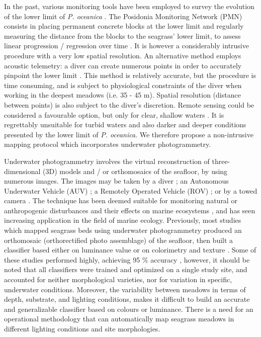 In the past, various monitoring tools have been employed to survey the evolution of the lower limit of \textit{P. oceanica} \citep{noel_cahier_2012}. The Posidonia Monitoring Network (PMN) consists in placing permanent concrete blocks at the lower limit and regularly measuring the distance from the blocks to the seagrass’ lower limit, to assess linear progression / regression over time \citep{boudouresque_monitoring_2007, pergent_protocole_2007}. It is however a considerably intrusive procedure with a very low spatial resolution. An alternative method employs acoustic telemetry: a diver can create numerous points in order to accurately pinpoint the lower limit \citep{descamp_underwater_2005, descamp_fast_2011}. This method is relatively accurate, but the procedure is time consuming, and is subject to physiological constraints of the diver when working in the deepest meadows (i.e. 35 - 45 m). Spatial resolution (distance between points) is also subject to the diver’s discretion. Remote sensing could be considered a favourable option, but only for clear, shallow waters \citep{koedsin_integrated_2016, pu_mapping_2017, topouzelis_seagrass_2018, traganos_mapping_2018}. It is regrettably unsuitable for turbid waters and also darker and deeper conditions presented by the lower limit of \textit{P. oceanica}. We therefore propose a non-intrusive mapping protocol which incorporates underwater photogrammetry.

Underwater photogrammetry involves the virtual reconstruction of three-dimensional (3D) models and / or orthomosaics of the seafloor, by using numerous images. The images may be taken by a diver \citep{mizuno_simple_2017}; an Autonomous Underwater Vehicle (AUV) \citep{bryson_automated_2013, bonin-font_towards_2016}; a Remotely Operated Vehicle (ROV) \citep{drap_rov_2015}; or by a towed camera \citep{rende_advances_2015}. The technique has been deemed suitable for monitoring natural or anthropogenic disturbances and their effects on marine ecosystems \citep{burns_assessing_2016}, and has seen increasing application in the field of marine ecology. Previously, most studies which mapped seagrass beds using underwater photogrammetry produced an orthomosaic (orthorectified photo assemblage) of the seafloor, then built a classifier based either on luminance value \citep{mizuno_simple_2017} or on colorimetry and texture \citep{rende_advances_2015, bonin-font_towards_2016}. Some of these studies performed highly, achieving 95 \% accuracy \citep{bonin-font_towards_2016}, however, it should be noted that all classifiers were trained and optimized on a single study site, and accounted for neither morphological varieties, nor for variation in specific, underwater conditions. Moreover, the variability between meadows in terms of depth, substrate, and lighting conditions, makes it difficult to build an accurate and generalizable classifier based on colours or luminance. There is a need for an operational methodology that can automatically map seagrass meadows in different lighting conditions and site morphologies.


